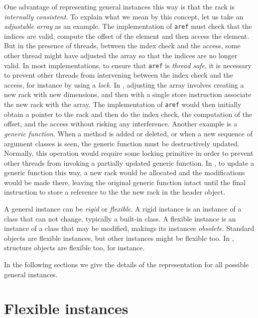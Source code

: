 One advantage of representing general instances this way is that the
rack is \emph{internally consistent}.  To explain what we
mean by this concept, let us take an \emph{adjustable array} as an
example.  The implementation of \texttt{aref} must check that the
indices are valid, compute the offset of the element and then access
the element.  But in the presence of threads, between the index check
and the access, some other thread might have adjusted the array so
that the indices are no longer valid.  In most implementations, to
ensure that \texttt{aref} is \emph{thread safe}, it is necessary to
prevent other threads from intervening between the index check and the
access, for instance by using a \emph{lock}.  In \sysname{}, adjusting
the array involves creating a new rack with new dimensions,
and then with a single store instruction associate the new rack
with the array. 
The implementation of \texttt{aref} would then
initially obtain a pointer to the rack and then do the
index check, the computation of the offset, and the access without
risking any interference.  Another
example is a \emph{generic function}.  When a method is added or
deleted, or when a new sequence of argument classes is seen, the
generic function must be destructively updated.  Normally, this
operation would require some locking primitive in order to prevent
other threads from invoking a partially updated generic function.  In
\sysname{}, to update a generic function this way, a new rack
would be allocated and the modifications would be made there,
leaving the original generic function intact until the final
instruction to store a reference to the the new rack in the
header object.

A general instance can be \emph{rigid} or \emph{flexible}.  A rigid
instance is an instance of a class that can not change, typically a
built-in class.  A flexible instance is an instance of a class that
may be modified, makings its instances \emph{obsolete}.  Standard
objects are flexible instances, but other instances might be flexible
too.  In \sysname{}, structure objects are flexible too, for
instance.

In the following sections we give the details of the representation
for all possible general instances.

\section{Flexible instances}
\label{sec-data-representation-flexible-instances}


